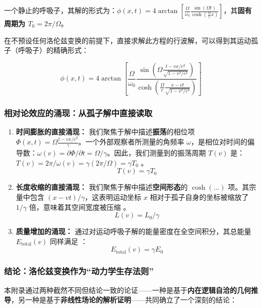 \documentclass[11pt, a4paper]{article}
\begin{document}
一个静止的呼吸子，其解的形式为：$\phi(x,t) = 4 \arctan\left[ \frac{\Omega}{\omega_0} \frac{\sin(\Omega t)}{\cosh\left(\frac{\Omega}{c}x\right)} \right]$，其\textbf{固有周期为 $T_0 = 2\pi / \Omega$}。

在不预设任何洛伦兹变换的前提下，直接求解此方程的行波解，可以得到其运动孤子（呼吸子）的精确形式：

\[
\phi(x,t) = 4 \arctan\left[ \frac{\Omega}{\omega_0} \frac{\sin\left( \Omega \frac{t - vx/c^2}{\sqrt{1 - v^2/c^2}} \right)}{\cosh\left( \frac{\Omega}{c} \frac{x - vt}{\sqrt{1 - v^2/c^2}} \right)} \right]
\]

\subsubsection{相对论效应的涌现：从孤子解中直接读取}

\begin{enumerate}
    \item \textbf{时间膨胀的直接涌现：}
    我们聚焦于解中描述\textbf{振荡}的相位项 $\Phi(x,t) = \Omega \frac{t - vx/c^2}{\gamma}$。一个外部观察者所测量的角频率 $\omega$，是相位对时间的偏导数：$\omega(v) = \partial\Phi/\partial t = \Omega/\gamma$。因此，我们测量到的振荡周期 $T(v)$ 是： $T(v) = 2\pi / \omega(v) = \gamma (2\pi/\Omega) = \gamma T_0$ \cite{Einstein1905}。
    \[
    \textbf{$T(v) = \gamma T_0$}
    \]

    \item \textbf{长度收缩的直接涌现：}
    我们聚焦于解中描述\textbf{空间形态}的 $\cosh(\dots)$ 项。其宗量中包含 $(x - vt) / \gamma$，这表明运动坐标 $x$ 相对于孤子自身的坐标被缩放了 $1/\gamma$ 倍，意味着其空间宽度被压缩 \cite{Einstein1905}。
    \[
    \textbf{$L(v) = L_0 / \gamma$}
    \]

    \item \textbf{质量增加的涌现：}
    通过对运动呼吸子解的能量密度在全空间积分，其总能量 $E_{\text{total}}(v)$ 同样满足 \cite{Einstein1905}：
    \[
    \textbf{$E_{\text{total}}(v) = \gamma E_0$}
    \]
\end{enumerate}

\subsubsection{结论：洛伦兹变换作为“动力学生存法则”}

本附录通过两种截然不同但结论一致的论证——一种是基于\textbf{内在逻辑自洽的几何推导}，另一种是基于\textbf{非线性场论的解析证明}——共同确立了一个深刻的结论：
\end{document}
